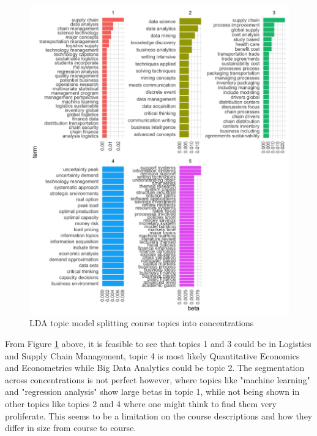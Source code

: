 \begin{figure}[H]
\centering

\includegraphics[width = .9\textwidth, height = .8\textheight]{Content/images/lda.png}
\caption{LDA topic model splitting course topics into concentrations}
\label{fig:lda}
\end{figure}

From Figure \ref{fig:lda} above, it is feasible to see that topics 1 and 3 could be in Logistics and Supply Chain Management, topic 4 is most likely Quantitative 
Economics and Econometrics while Big Data Analytics could be topic 2. The segmentation across concentrations is not perfect however, where topics like "machine 
learning" and "regression analysis" show large betas in topic 1, while not being shown in other topics like topics 2 and 4 where one might think to find them 
very proliferate. This seems to be a limitation on the course descriptions and how they differ in size from course to course.  

